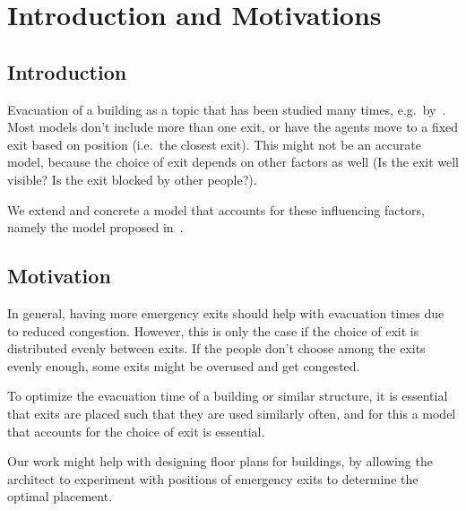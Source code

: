 \section{Introduction and Motivations}
\subsection{Introduction}
Evacuation of a building as a topic that has been studied many times,
e.g.\ by~\citet{Helbing2000}.
Most models don't include more than one exit, or have the agents move to a
fixed exit based on position (i.e.\ the closest exit). This might not be an
accurate model, because the choice of exit depends on other factors as well (Is
the exit well visible? Is the exit blocked by other people?).

We extend and concrete a model that accounts for these influencing factors,
namely the model proposed in~\citet{Wang2016}.

\subsection{Motivation}
In general, having more emergency exits should help with evacuation times due
to reduced congestion. However, this is only the case if the choice of exit is
distributed evenly between exits. If the people don't choose among the exits
evenly enough, some exits might be overused and get congested.

To optimize the evacuation time of a building or similar structure, it is
essential that exits are placed such that they are used similarly often, and
for this a model that accounts for the choice of exit is essential.

Our work might help with designing floor plans for buildings, by allowing the
architect to experiment with positions of emergency exits to determine the
optimal placement.
